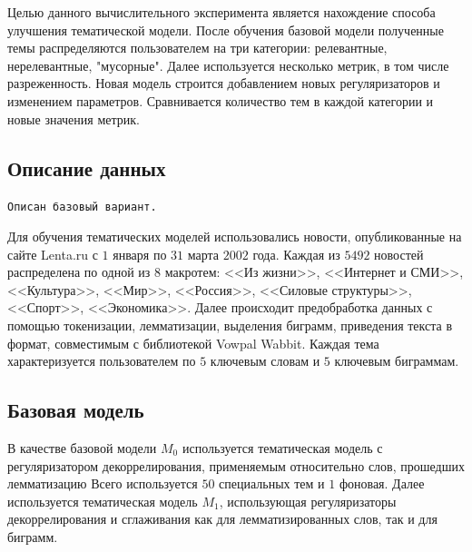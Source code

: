 \documentclass{article}
\begin{document}
Целью данного вычислительного эксперимента является нахождение способа улучшения тематической модели.
После обучения базовой модели полученные темы распределяются пользователем на три категории: релевантные, нерелевантные, "мусорные".
Далее используется несколько метрик, в том числе разреженность.
Новая модель строится добавлением новых регуляризаторов и изменением параметров.
Сравнивается количество тем в каждой категории и новые значения метрик.

\subsection{Описание данных}

\texttt{Описан базовый вариант.}

Для обучения тематических моделей использовались новости, опубликованные на сайте Lenta.ru с $1$ января по $31$ марта $2002$ года.
Каждая из $5492$ новостей распределена по одной из $8$ макротем: <<Из жизни>>, <<Интернет и СМИ>>, <<Культура>>, <<Мир>>, <<Россия>>, <<Силовые структуры>>, <<Спорт>>, <<Экономика>>.
Далее происходит предобработка данных с помощью токенизации, лемматизации, выделения биграмм, приведения текста в формат, совместимым с библиотекой Vowpal Wabbit.
Каждая тема характеризуется пользователем по $5$ ключевым словам и $5$ ключевым биграммам.


\subsection{Базовая модель}


В качестве базовой модели $M_0$ используется тематическая модель с регуляризатором декоррелирования, применяемым относительно слов, прошедших лемматизацию
Всего используется $50$ специальных тем и $1$ фоновая.
Далее используется тематическая модель $M_1$, использующая регуляризаторы декоррелирования и сглаживания как для лемматизированных слов, так и для биграмм.
\end{document}
